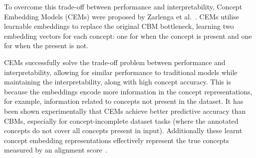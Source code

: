 To overcome this trade-off
between performance and interpretability, 
Concept Embedding Models (CEMs) were proposed by Zarlenga et al.~\cite{cem}.
CEMs utilise learnable embeddings to replace the original CBM bottleneck,
learning two embedding vectors for each concept: one for
when the concept is present
and one for when the present is not.

CEMs successfully solve the trade-off problem between performance and interpretability,
allowing for similar performance to traditional models while maintaining the
interpretability, along with high concept accuracy. This is because the embeddings
encode more information
in the concept representations, for example, information
related to concepts not present in the dataset.
 It has been shown experimentally
that CEMs achieve better predictive accuracy than CBMs,
especially for 
concept-incomplete dataset tasks (where
the annotated concepts
do not cover all concepts present in input).
Additionally these learnt concept
embedding representations effectively represent the true concepts measured by an alignment score~\cite{cem}.

